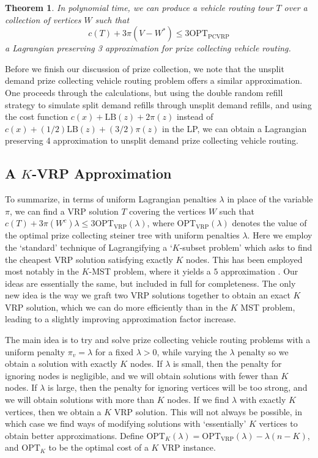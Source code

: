 \documentclass{article}
\theoremstyle{plain}
\newtheorem{theorem}{Theorem}
\begin{document}
\begin{theorem}
    In polynomial time, we can produce a vehicle routing tour $T$ over a collection of vertices $W$ such that
    \[ c(T) + 3\pi(V - W^*) \leq 3 \text{OPT}_{\text{PCVRP}} \]
    a Lagrangian preserving 3 approximation for prize collecting vehicle routing.
\end{theorem}

Before we finish our discussion of prize collection, we note that the unsplit demand prize collecting vehicle routing problem offers a similar approximation. One proceeds through the calculations, but using the double random refill strategy to simulate split demand refills through unsplit demand refills, and using the cost function $c(x) + \text{LB}(z) + 2 \pi(z)$ instead of $c(x) + (1/2) \text{LB}(z) + (3/2) \pi(z)$ in the LP, we can obtain a Lagrangian preserving 4 approximation to unsplit demand prize collecting vehicle routing.


\subsection{A $K$-VRP Approximation}

To summarize, in terms of uniform Lagrangian penalties $\lambda$ in place of the variable $\pi$, we can find a VRP solution $T$ covering the vertices $W$ such that $c(T) + 3 \pi(W^c) \lambda \leq 3 \text{OPT}_{\text{VRP}}(\lambda)$, where $\text{OPT}_{\text{VRP}}(\lambda)$ denotes the value of the optimal prize collecting steiner tree with uniform penalties $\lambda$. Here we employ the `standard' technique of Lagrangifying a `$K$-subset problem' which asks to find the cheapest VRP solution satisfying exactly $K$ nodes. This has been employed most notably in the $K$-MST problem, where it yields a $5$ approximation \cite{MSTLPApprox}. Our ideas are essentially the same, but included in full for completeness. The only new idea is the way we graft two VRP solutions together to obtain an exact $K$ VRP solution, which we can do more efficiently than in the $K$ MST problem, leading to a slightly improving approximation factor increase.

The main idea is to try and solve prize collecting vehicle routing problems with a uniform penalty $\pi_v = \lambda$ for a fixed $\lambda > 0$, while varying the $\lambda$ penalty so we obtain a solution with exactly $K$ nodes. If $\lambda$ is small, then the penalty for ignoring nodes is negligible, and we will obtain solutions with fewer than $K$ nodes. If $\lambda$ is large, then the penalty for ignoring vertices will be too strong, and we will obtain solutions with more than $K$ nodes. If we find $\lambda$ with exactly $K$ vertices, then we obtain a $K$ VRP solution. This will not always be possible, in which case we find ways of modifying solutions with `essentially' $K$ vertices to obtain better approximations. Define $\text{OPT}_K(\lambda) = \text{OPT}_{\text{VRP}}(\lambda) - \lambda (n - K)$, and $\text{OPT}_K$ to be the optimal cost of a $K$ VRP instance.
\end{document}
